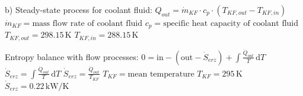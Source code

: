 b) Steady-state process for coolant fluid:  
\( Q_{out} = \dot{m}_{KF} \cdot c_p \cdot (T_{KF,out} - T_{KF,in}) \)  
\( \dot{m}_{KF} = \text{mass flow rate of coolant fluid} \)  
\( c_p = \text{specific heat capacity of coolant fluid} \)  
\( T_{KF,out} = 298.15 \, \text{K} \)  
\( T_{KF,in} = 288.15 \, \text{K} \)

Entropy balance with flow processes:  
\( 0 = \text{in} - (\text{out} - \dot{S}_{erz}) + \int \frac{\dot{Q}_{out}}{T} \, \text{d}T \)  
\( \dot{S}_{erz} = \int \frac{\dot{Q}_{out}}{T} \, \text{d}T \)  
\( \dot{S}_{erz} = \frac{\dot{Q}_{out}}{T_{KF}} \)  
\( T_{KF} = \text{mean temperature} \)  
\( T_{KF} = 295 \, \text{K} \)  
\( \dot{S}_{erz} = 0.22 \, \text{kW/K} \)